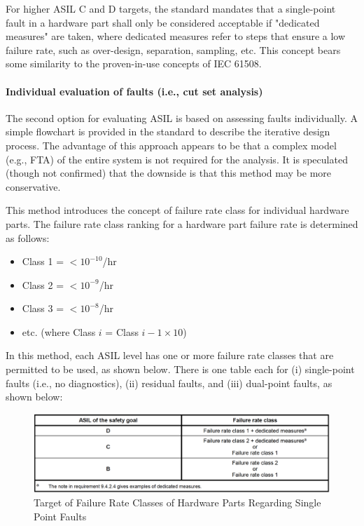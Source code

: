 \documentclass[./dissertation.tex]{subfiles}
\begin{document}
For higher ASIL C and D targets, the standard mandates that a single-point fault in a hardware part shall only be considered acceptable if "dedicated measures" are taken, where dedicated measures refer to steps that ensure a low failure rate, such as over-design, separation, sampling, etc. This concept bears some similarity to the proven-in-use concepts of IEC 61508.

\paragraph{Individual evaluation of faults (i.e., cut set analysis)}

The second option for evaluating ASIL is based on assessing faults individually. A simple flowchart is provided in the standard to describe the iterative design process. The advantage of this approach appears to be that a complex model (e.g., FTA) of the entire system is not required for the analysis. It is speculated (though not confirmed) that the downside is that this method may be more conservative.

This method introduces the concept of failure rate class for individual hardware parts. The failure rate class ranking for a hardware part failure rate is determined as follows:

\begin{itemize}
\item Class 1 = $<10^{-10}$/hr
\item Class 2 = $<10^{-9}$/hr
\item Class 3 = $<10^{-8}$/hr
\item etc. (where Class $i$ = Class $i-1 \times 10$)
\end{itemize}

In this method, each ASIL level has one or more failure rate classes that are permitted to be used, as shown below. There is one table each for (i) single-point faults (i.e., no diagnostics), (ii) residual faults, and (iii) dual-point faults, as shown below:


\begin{figure}[H]
\centering
\includegraphics[width=\linewidth]{subfiles/imgs/asil-t-7.png}
\caption{Target of Failure Rate Classes of Hardware Parts Regarding Single Point Faults}
\label{fig:asil-t-7}
\end{figure}
\end{document}
